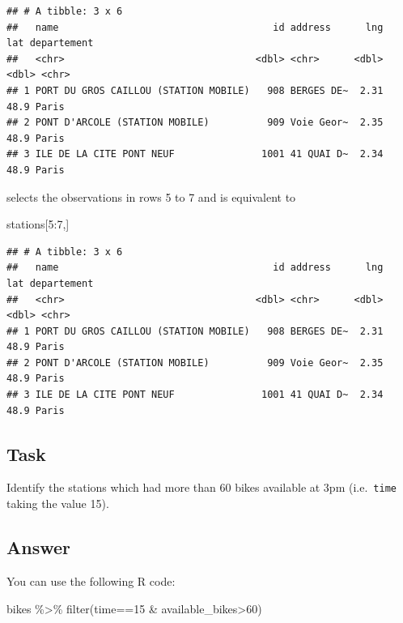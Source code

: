 \documentclass[
]{book}
\newenvironment{Shaded}{\begin{snugshade}}{\end{snugshade}}
\newcommand{\DecValTok}[1]{\textcolor[rgb]{0.00,0.00,0.81}{#1}}
\newcommand{\FunctionTok}[1]{\textcolor[rgb]{0.00,0.00,0.00}{#1}}
\newcommand{\NormalTok}[1]{#1}
\newcommand{\SpecialCharTok}[1]{\textcolor[rgb]{0.00,0.00,0.00}{#1}}
\begin{document}
\begin{verbatim}
## # A tibble: 3 x 6
##   name                                     id address      lng   lat departement
##   <chr>                                 <dbl> <chr>      <dbl> <dbl> <chr>      
## 1 PORT DU GROS CAILLOU (STATION MOBILE)   908 BERGES DE~  2.31  48.9 Paris      
## 2 PONT D'ARCOLE (STATION MOBILE)          909 Voie Geor~  2.35  48.9 Paris      
## 3 ILE DE LA CITE PONT NEUF               1001 41 QUAI D~  2.34  48.9 Paris
\end{verbatim}

selects the observations in rows 5 to 7 and is equivalent to

\begin{Shaded}
\begin{Highlighting}[]
\NormalTok{stations[}\DecValTok{5}\SpecialCharTok{:}\DecValTok{7}\NormalTok{,]}
\end{Highlighting}
\end{Shaded}

\begin{verbatim}
## # A tibble: 3 x 6
##   name                                     id address      lng   lat departement
##   <chr>                                 <dbl> <chr>      <dbl> <dbl> <chr>      
## 1 PORT DU GROS CAILLOU (STATION MOBILE)   908 BERGES DE~  2.31  48.9 Paris      
## 2 PONT D'ARCOLE (STATION MOBILE)          909 Voie Geor~  2.35  48.9 Paris      
## 3 ILE DE LA CITE PONT NEUF               1001 41 QUAI D~  2.34  48.9 Paris
\end{verbatim}

\hypertarget{task-3}{%
\subsection{Task}\label{task-3}}

Identify the stations which had more than 60 bikes available at 3pm (i.e.~\texttt{time} taking the value 15).

\hypertarget{answer-2}{%
\subsection{Answer}\label{answer-2}}

You can use the following R code:

\begin{Shaded}
\begin{Highlighting}[]
\NormalTok{bikes }\SpecialCharTok{\%\textgreater{}\%}
  \FunctionTok{filter}\NormalTok{(time}\SpecialCharTok{==}\DecValTok{15} \SpecialCharTok{\&}\NormalTok{ available\_bikes}\SpecialCharTok{\textgreater{}}\DecValTok{60}\NormalTok{)}
\end{Highlighting}
\end{Shaded}
\end{document}
